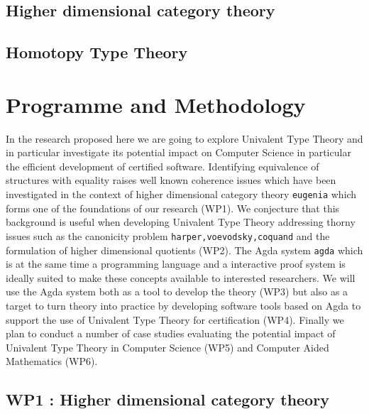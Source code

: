 \documentclass[a4paper]{article}
\renewcommand{\cite}[1]{{\tt #1}}
\begin{document}


\subsection{Higher dimensional category theory}
\label{sec:high-dimens-categ}

\subsection{Homotopy Type Theory}
\label{sec:homotopy-type-theory}


\section{Programme and Methodology}

In the research proposed here we are going to explore Univalent Type
Theory and in particular investigate its potential impact on Computer
Science in particular the efficient development of certified
software. Identifying equivalence of structures with equality raises
well known coherence issues which have been investigated in the
context of higher dimensional category theory \cite{eugenia} which
forms one of the foundations of our research (WP1). We conjecture that
this background is useful when developing Univalent Type Theory
addressing thorny issues such as the canonicity problem
\cite{harper,voevodsky,coquand} and the formulation of higher
dimensional quotients (WP2). The Agda system \cite{agda} which is at
the same time a programming language and a interactive proof system is
ideally suited to make these concepts available to interested
researchers. We will use the Agda system both as a tool to develop the
theory (WP3) but also as a target to turn theory into practice by developing
software tools based on Agda to support the use of Univalent Type
Theory for certification (WP4). Finally we plan to conduct a number of
case studies evaluating the potential impact of Univalent Type Theory
in Computer Science (WP5) and Computer Aided Mathematics (WP6).

\subsection*{WP1 : Higher dimensional category theory}
\label{sec:wp:qio}
\end{document}
